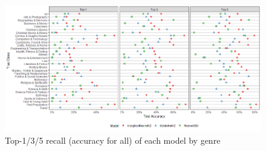 \documentclass[12pt]{article}
\numberwithin{equation}{section}
\numberwithin{figure}{section}
\begin{document}
\begin{figure}
	\centering
	\captionsetup{justification=centering}
	\includegraphics[scale=0.5]{accuracy_by_model.png}
	\caption{Top-1/3/5 recall (accuracy for all) of each model by genre}
	\label{fig:test_perf}
\end{figure}
\end{document}
